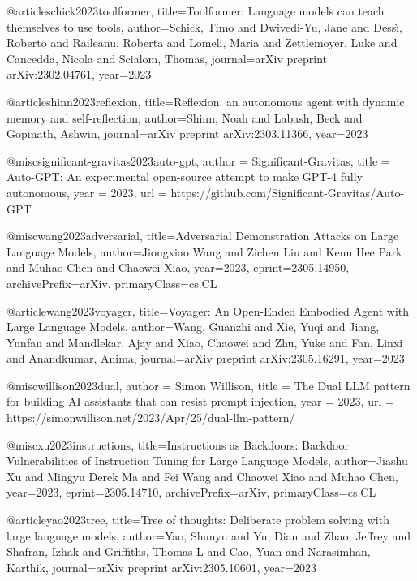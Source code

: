 @article{schick2023toolformer,
  title={Toolformer: Language models can teach themselves to use tools},
  author={Schick, Timo and Dwivedi-Yu, Jane and Dess{\`\i}, Roberto and Raileanu, Roberta and Lomeli, Maria and Zettlemoyer, Luke and Cancedda, Nicola and Scialom, Thomas},
  journal={arXiv preprint arXiv:2302.04761},
  year={2023}
}

@article{shinn2023reflexion,
  title={Reflexion: an autonomous agent with dynamic memory and self-reflection},
  author={Shinn, Noah and Labash, Beck and Gopinath, Ashwin},
  journal={arXiv preprint arXiv:2303.11366},
  year={2023}
}

@misc{significant-gravitas2023auto-gpt,
  author = {Significant-Gravitas},
  title = {Auto-GPT: An experimental open-source attempt to make GPT-4 fully autonomous},
  year = {2023},
  url = {https://github.com/Significant-Gravitas/Auto-GPT}
}

@misc{wang2023adversarial,
      title={Adversarial Demonstration Attacks on Large Language Models},
      author={Jiongxiao Wang and Zichen Liu and Keun Hee Park and Muhao Chen and Chaowei Xiao},
      year={2023},
      eprint={2305.14950},
      archivePrefix={arXiv},
      primaryClass={cs.CL}
}

@article{wang2023voyager,
  title={Voyager: An Open-Ended Embodied Agent with Large Language Models},
  author={Wang, Guanzhi and Xie, Yuqi and Jiang, Yunfan and Mandlekar, Ajay and Xiao, Chaowei and Zhu, Yuke and Fan, Linxi and Anandkumar, Anima},
  journal={arXiv preprint arXiv:2305.16291},
  year={2023}
}

@misc{willison2023dual,
  author = {Simon Willison},
  title = {The Dual LLM pattern for building AI assistants that can resist prompt injection},
  year = {2023},
  url = {https://simonwillison.net/2023/Apr/25/dual-llm-pattern/}
}

@misc{xu2023instructions,
      title={Instructions as Backdoors: Backdoor Vulnerabilities of Instruction Tuning for Large Language Models},
      author={Jiashu Xu and Mingyu Derek Ma and Fei Wang and Chaowei Xiao and Muhao Chen},
      year={2023},
      eprint={2305.14710},
      archivePrefix={arXiv},
      primaryClass={cs.CL}
}

@article{yao2023tree,
  title={Tree of thoughts: Deliberate problem solving with large language models},
  author={Yao, Shunyu and Yu, Dian and Zhao, Jeffrey and Shafran, Izhak and Griffiths, Thomas L and Cao, Yuan and Narasimhan, Karthik},
  journal={arXiv preprint arXiv:2305.10601},
  year={2023}
}


